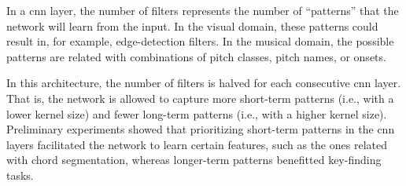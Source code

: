 
In a \gls{cnn} layer, the number of filters represents the
number of ``patterns'' that the network will learn from the
input. In the visual domain, these patterns could result in,
for example, edge-detection filters. In the musical domain,
the possible patterns are related with combinations of pitch
classes, pitch names, or onsets.

In this architecture, the number of filters is halved for
each consecutive \gls{cnn} layer. That is, the network is
allowed to capture more short-term patterns (i.e., with a
lower kernel size) and fewer long-term patterns (i.e., with
a higher kernel size). Preliminary experiments showed that
prioritizing short-term patterns in the \gls{cnn} layers
facilitated the network to learn certain features, such as
the ones related with chord segmentation, whereas
longer-term patterns benefitted key-finding tasks.
